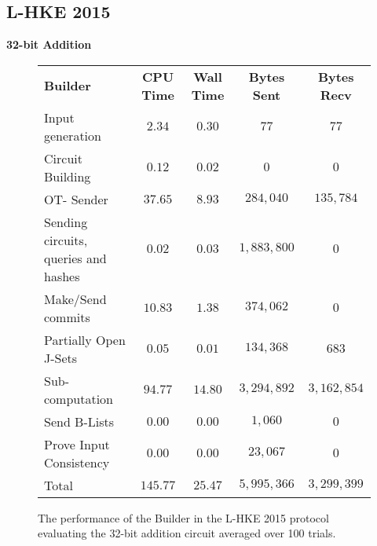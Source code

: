 \documentclass[ %
                    author={Nicholas Tutte},
                supervisor={Prof. Nigel Smart},
                    degree={MEng},
                     title={Secure Two Party Computation},
                  subtitle={A practical comparison of recent protocols},
                      type={Research - GG1K},
                      year={2015} ]{dissertation}
\begin{document}
			\subsection{L-HKE 2015}
				\FloatBarrier
				\noindent \textbf{32-bit Addition}
				\begin{figure}[!ht]
					\begin{tabular}{| p{4.3cm} | c c c c |}
						\hline
						\textbf{Builder} & \textbf{CPU Time} & \textbf{Wall Time} & \textbf{Bytes Sent} & \textbf{Bytes Recv} \\
						\thickhline
						Input generation & $2.34$ & $0.30$ & $77$ & $77$ \\
						\hline
						Circuit Building & $0.12$ & $0.02$ & $0$ & $0$ \\
						\hline
						OT- Sender & $37.65$ & $8.93$ & $284,040$ & $135,784$ \\
						\hline
						Sending circuits, queries and hashes & $0.02$ & $0.03$ & $1,883,800$ & $0$ \\
						\hline
						Make/Send commits & $10.83$ & $1.38$ & $374,062$ & $0$ \\
						\hline
						Partially Open J-Sets & $0.05$ & $0.01$ & $134,368$ & $683$ \\
						\hline
						Sub-computation & $94.77$ & $14.80$ & $3,294,892$ & $3,162,854$ \\
						\hline
						Send B-Lists & $0.00$ & $0.00$ & $1,060$ & $0$ \\
						\hline
						Prove Input Consistency & $0.00$ & $0.00$ & $23,067$ & $0$ \\
						\thickhline
						Total & $145.77$ & $25.47$ & $5,995,366$ & $3,299,399$ \\
						\hline
					\end{tabular}
					\caption{The performance of the Builder in the L-HKE 2015 protocol evaluating the 32-bit addition circuit averaged over 100 trials. \label{table:L-HKE_2015_Add_Builder}}
				\end{figure}
\end{document}
